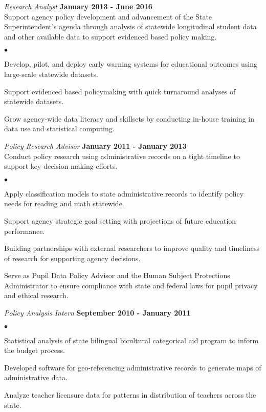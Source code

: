 \documentclass[margin,line]{res}
\newenvironment{list2}{
  \begin{list}{$\bullet$}{%
      \setlength{\itemsep}{0in}
      \setlength{\parsep}{0in} \setlength{\parskip}{0in}
      \setlength{\topsep}{0in} \setlength{\partopsep}{0in} 
      \setlength{\leftmargin}{0.2in}}}{\end{list}}
\begin{document}
\begin{resume}
\vspace{-.3cm}
{\em Research Analyst} \hfill {\bf January 2013 - June 2016}\\
Support agency policy development and advancement of the State Superintendent's agenda through analysis of statewide longitudinal student data and other available data to support evidenced based policy making. 
\begin{list2}
\item Develop, pilot, and deploy early warning systems for educational outcomes using large-scale statewide datasets. 
\item Support evidenced based policymaking with quick turnaround analyses of statewide datasets. 
\item Grow agency-wide data literacy and skillsets by conducting in-house training in data use and statistical computing.
\end{list2}

\vspace{-.3cm}
{\em Policy Research Advisor} \hfill {\bf January 2011 - January 2013}\\
Conduct policy research using administrative records on a tight timeline to support key decision making efforts. 
\begin{list2}
\item Apply classification models to state administrative records to identify policy needs for reading and math statewide.
\item Support agency strategic goal setting with projections of future education performance.
\item Building partnerships with external researchers to improve quality and timeliness of research for supporting agency decisions.
\item Serve as Pupil Data Policy Advisor and the Human Subject Protections Administrator to ensure compliance with state and federal laws for pupil privacy and ethical research.
\end{list2}

\vspace{-.3cm}
{\em Policy Analysis Intern} \hfill {\bf September 2010 - January 2011}\\
\begin{list2}
\item Statistical analysis of state bilingual bicultural categorical aid program to inform the budget process.
\item Developed software for geo-referencing administrative records to generate maps of administrative data.
\item Analyze teacher licensure data for patterns in distribution of teachers across the state.
\end{list2}


\end{resume}
\end{document}
